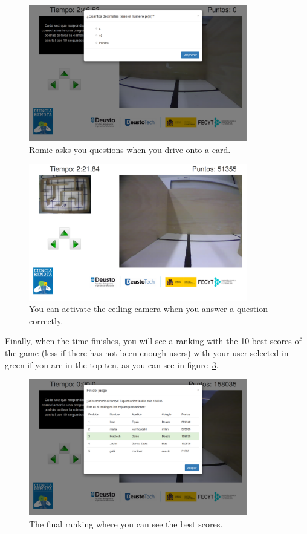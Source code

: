 \begin{figure}[!htbp]
	\centering
	\includegraphics[width=0.85\textwidth]{fig/manuals/trivial/romie-question}
	\caption{Romie asks you questions when you drive onto a card.}
	\label{fig:man:romie_question}
\end{figure}

\begin{figure}[!htbp]
	\centering
	\includegraphics[width=0.85\textwidth]{fig/manuals/trivial/romie-ceiling}
	\caption{You can activate the ceiling camera when you answer a question correctly.}
	\label{fig:man:romie_ceiling}
\end{figure}

Finally, when the time finishes, you will see a ranking with the 10 best scores of the game (less if
there has not been enough users) with your user selected in green if you are in the top ten, as you
can see in figure~\ref{fig:man:romie_ranking}.

\begin{figure}[!htbp]
	\centering
	\includegraphics[width=0.85\textwidth]{fig/manuals/trivial/romie-ranking}
	\caption{The final ranking where you can see the best scores.}
	\label{fig:man:romie_ranking}
\end{figure}

